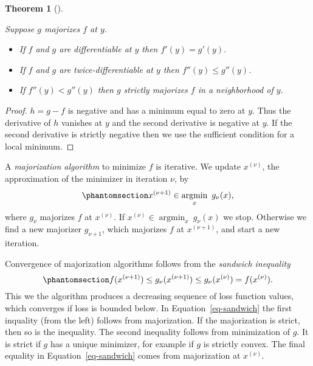 \documentclass[
  12pt,
  letterpaper,
  DIV=11,
  numbers=noendperiod]{scrartcl}
\providecommand{\tightlist}{%
  \setlength{\itemsep}{0pt}\setlength{\parskip}{0pt}}\usepackage{longtable,booktabs,array}
\theoremstyle{definition}
\theoremstyle{plain}
\theoremstyle{plain}
\newtheorem{theorem}{Theorem}[section]
\theoremstyle{plain}
\theoremstyle{definition}
\theoremstyle{remark}
\begin{document}
\begin{theorem}[]\protect\hypertarget{thm-diff}{}\label{thm-diff}

Suppose \(g\) majorizes \(f\) at \(y\).

\begin{itemize}
\tightlist
\item
  If \(f\) and \(g\) are differentiable at \(y\) then \(f'(y)=g'(y)\).
\item
  If \(f\) and \(g\) are twice-differentiable at \(y\) then
  \(f''(y)\leq g''(y)\).
\item
  If \(f''(y)<g''(y)\) then \(g\) strictly majorizes \(f\) in a
  neighborhood of \(y\).
\end{itemize}

\end{theorem}

\begin{proof}
\(h=g-f\) is negative and has a minimum equal to zero at \(y\). Thus the
derivative of \(h\) vanishes at \(y\) and the second derivative is
negative at \(y\). If the second derivative is strictly negative then we
use the sufficient condition for a local minimum.
\end{proof}

A \emph{majorization algorithm} to minimize \(f\) is iterative. We
update \(x^{(\nu)}\), the approximation of the minimizer in iteration
\(\nu\), by \begin{equation}\phantomsection\label{eq-majmaj}{
x^{(\nu+1)}\in\mathop{\text{argmin}}_x\ g_\nu(x),
}\end{equation} where \(g_\nu\) majorizes \(f\) at \(x^{(\nu)}\). If
\(x^{(\nu)}\in\mathop{\text{argmin}}_x\ g_\nu(x)\) we stop. Otherwise we
find a new majorizer \(g_{\nu+1}\), which majorizes \(f\) at
\(x^{(\nu+1)}\), and start a new iteration.

Convergence of majorization algorithms follows from the \emph{sandwich
inequality} \begin{equation}\phantomsection\label{eq-sandwich}{
f(x^{(\nu+1)})\leq g_\nu(x^{(\nu+1)})\leq g_\nu(x^{(\nu)})=f(x^{(\nu)}).
}\end{equation} This we the algorithm produces a decreasing sequence of
loss function values, which converges if loss is bounded below. In
Equation~\ref{eq-sandwich} the first inquality (from the left) follows
from majorization. If the majorization is strict, then so is the
inequality. The second inequality follows from minimization of \(g\). It
is strict if \(g\) has a unique minimizer, for example if \(g\) is
strictly convex. The final equality in Equation~\ref{eq-sandwich} comes
from majorization at \(x^{(\nu)}\).
\end{document}
